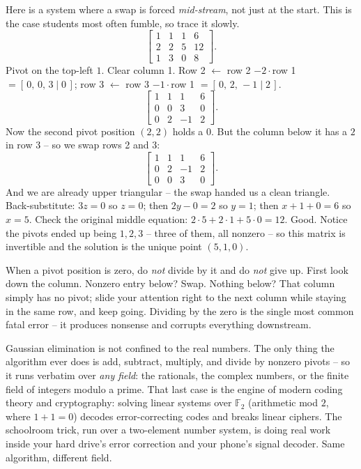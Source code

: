 Here is a system where a swap is forced \emph{mid-stream}, not just at the start.
This is the case students most often fumble, so trace it slowly.
\[
\left[\begin{array}{ccc|c}
1 & 1 & 1 & 6\\
2 & 2 & 5 & 12\\
1 & 3 & 0 & 8
\end{array}\right].
\]
Pivot on the top-left $1$. Clear column 1. Row 2 $\leftarrow$ row 2 $-2\cdot$row
1 $= [\,0,\,0,\,3\mid 0\,]$; row 3 $\leftarrow$ row 3 $-1\cdot$row 1 $=
[\,0,\,2,\,-1\mid 2\,]$.
\[
\left[\begin{array}{ccc|c}
1 & 1 & 1 & 6\\
0 & 0 & 3 & 0\\
0 & 2 & -1 & 2
\end{array}\right].
\]
Now the second pivot position $(2,2)$ holds a $0$. But the column below it has a
$2$ in row 3 -- so we swap rows 2 and 3:
\[
\left[\begin{array}{ccc|c}
1 & 1 & 1 & 6\\
0 & 2 & -1 & 2\\
0 & 0 & 3 & 0
\end{array}\right].
\]
And we are already upper triangular -- the swap handed us a clean triangle.
Back-substitute: $3z = 0$ so $z = 0$; then $2y - 0 = 2$ so $y = 1$; then
$x + 1 + 0 = 6$ so $x = 5$. Check the original middle equation:
$2\cdot 5 + 2\cdot 1 + 5\cdot 0 = 12$. Good. Notice the pivots ended up being
$1,2,3$ -- three of them, all nonzero -- so this matrix is invertible and the
solution is the unique point $(5,1,0)$.

\begin{trapbox}
When a pivot position is zero, do \emph{not} divide by it and do \emph{not} give
up. First look down the column. Nonzero entry below? Swap. Nothing below? That
column simply has no pivot; slide your attention right to the next column while
staying in the same row, and keep going. Dividing by the zero is the single most
common fatal error -- it produces nonsense and corrupts everything downstream.
\end{trapbox}

\begin{connectionbox}
Gaussian elimination is not confined to the real numbers. The only thing the
algorithm ever does is add, subtract, multiply, and divide by nonzero pivots --
so it runs verbatim over \emph{any field}: the rationals, the complex numbers,
or the finite field of integers modulo a prime. That last case is the engine of
modern coding theory and cryptography: solving linear systems over
$\mathbb{F}_2$ (arithmetic mod $2$, where $1+1=0$) decodes error-correcting
codes and breaks linear ciphers. The schoolroom trick, run over a two-element
number system, is doing real work inside your hard drive's error correction and
your phone's signal decoder. Same algorithm, different field.
\end{connectionbox}

